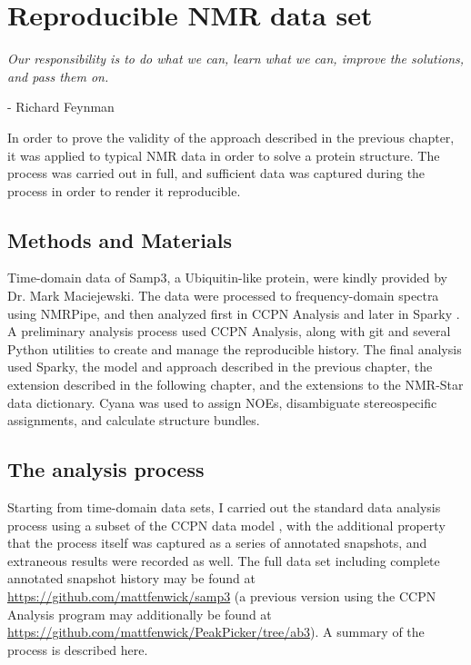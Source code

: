 \chapter{Reproducible NMR data set}

\begin{center}
  \textit{Our responsibility is to do what we can, learn what we can, 
    improve the solutions, and pass them on.}

 - Richard Feynman
\end{center}


In order to prove the validity of the approach described in the previous
chapter, it was applied to typical NMR data in order to solve a protein
structure.  The process was carried out in full, and sufficient data was
captured during the process in order to render it reproducible.


\section{Methods and Materials}

Time-domain data of Samp3, a Ubiquitin-like protein, were kindly provided by 
Dr. Mark Maciejewski.  The data were processed to frequency-domain spectra
using NMRPipe, and then analyzed first in CCPN Analysis \cite{ccpn} and later 
in Sparky \cite{sparky}.  A preliminary analysis process used CCPN Analysis,
along with git and several Python utilities to create and manage the 
reproducible history.  The final analysis used Sparky, the model and approach
described in the previous chapter, the extension described in the following
chapter, and the extensions to the NMR-Star data dictionary.  
Cyana was used to assign NOEs,
disambiguate stereospecific assignments, and calculate structure bundles.


\section{The analysis process}
Starting from time-domain data sets, I carried out the standard data analysis
process using a subset of the CCPN data model \cite{ccpn}, 
with the additional property that the process itself was captured as
a series of annotated snapshots, and extraneous results were recorded as well.
The full data set including complete annotated snapshot history may be found at 
\url{https://github.com/mattfenwick/samp3}
(a previous version using the CCPN Analysis program may additionally be found
at \url{https://github.com/mattfenwick/PeakPicker/tree/ab3}).
A summary of the process is described here.

